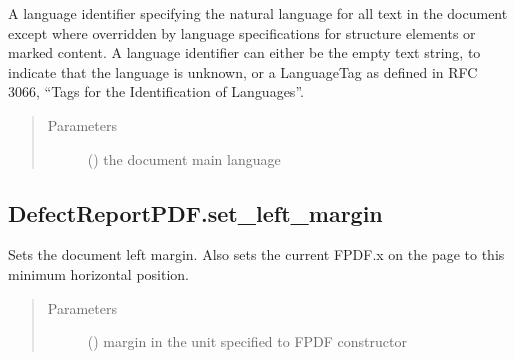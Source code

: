\documentclass[letterpaper,10pt,english]{sphinxmanual}
\begin{document}
\begin{fulllineitems}
\begin{fulllineitems}
\label{\detokenize{generated/quality_assessment.quality_pdf_report.DefectReportPDF.set_lang:quality_assessment.quality_pdf_report.DefectReportPDF.set_lang}}
\sphinxAtStartPar
A language identifier specifying the natural language for all text in the document
except where overridden by language specifications for structure elements or marked content.
A language identifier can either be the empty text string, to indicate that the language is unknown,
or a Language\sphinxhyphen{}Tag as defined in RFC 3066, “Tags for the Identification of Languages”.
\begin{quote}\begin{description}
\item[{Parameters}] \leavevmode
\sphinxAtStartPar
{} () \textendash{} the document main language

\end{description}\end{quote}

\end{fulllineitems}



\subsection{DefectReportPDF.set\_left\_margin}
\label{\detokenize{generated/quality_assessment.quality_pdf_report.DefectReportPDF.set_left_margin:defectreportpdf-set-left-margin}}\label{\detokenize{generated/quality_assessment.quality_pdf_report.DefectReportPDF.set_left_margin::doc}}

\begin{fulllineitems}
\label{\detokenize{generated/quality_assessment.quality_pdf_report.DefectReportPDF.set_left_margin:quality_assessment.quality_pdf_report.DefectReportPDF.set_left_margin}}
\sphinxAtStartPar
Sets the document left margin.
Also sets the current FPDF.x on the page to this minimum horizontal position.
\begin{quote}\begin{description}
\item[{Parameters}] \leavevmode
\sphinxAtStartPar
{} () \textendash{} margin in the unit specified to FPDF constructor


\end{description}
\end{quote}
\end{fulllineitems}
\end{fulllineitems}
\end{document}
